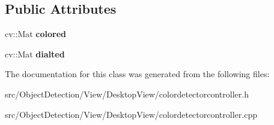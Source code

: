 \subsection*{Public Attributes}
\begin{DoxyCompactItemize}
\item 
\mbox{\label{class_color_detector_controller_a639034f23f3b7beeaf7001a4a8d5ffd0}} 
cv\+::\+Mat {\bfseries colored}
\item 
\mbox{\label{class_color_detector_controller_ab5ae6d433e9192bd1cbd2bb6e95cf675}} 
cv\+::\+Mat {\bfseries dialted}
\end{DoxyCompactItemize}


The documentation for this class was generated from the following files\+:\begin{DoxyCompactItemize}
\item 
src/\+Object\+Detection/\+View/\+Desktop\+View/colordetectorcontroller.\+h\item 
src/\+Object\+Detection/\+View/\+Desktop\+View/colordetectorcontroller.\+cpp\end{DoxyCompactItemize}

